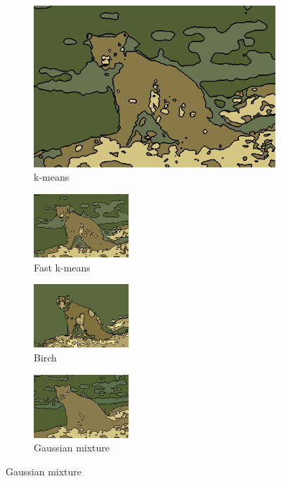 \documentclass[journal]{IEEEtran}
\begin{document}
\begin{figure}[!t]
           
    \begin{subfigure}[b]{\textwidth+20pt\relax}
    	\centering
    	\includegraphics[width=\dimexpr\linewidth-20pt\relax]{160067_KMeans_const_segm_HSL} 
    	\caption{k-means}
    \end{subfigure}      
    \begin{subfigure}[b]{0.23\textwidth}
    	\centering
        \includegraphics[height=67.68857pt]{160067_MiniBatchKMeans_const_segm_HSL}
        \caption{Fast k-means}
    \end{subfigure}
    \begin{subfigure}[b]{0.23\textwidth}
    	\centering
        \includegraphics[height=67.68857pt]{160067_Birch_const_segm_HSL}
        \caption{Birch}
    \end{subfigure}
    \begin{subfigure}[b]{0.23\textwidth}
    	\centering
        \includegraphics[height=67.68857pt]{160067_GaussianMixture_const_segm_HSL}
        \caption{Gaussian mixture}
    \end{subfigure} 
    

\end{figure}
\end{document}
